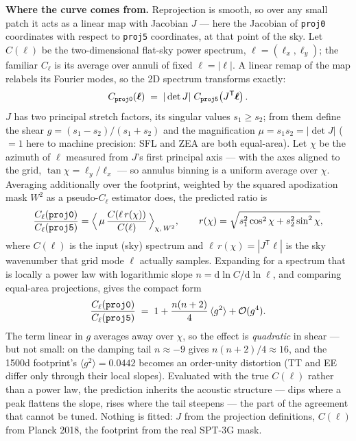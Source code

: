 \documentclass[10pt]{article}
\newcommand{\proj}[1]{\texttt{#1}}
\begin{document}
\textbf{Where the curve comes from.}
Reprojection is smooth, so over any small patch it acts as a linear map with Jacobian $J$ --- here the Jacobian of \proj{proj0} coordinates with respect to \proj{proj5} coordinates, at that point of the sky.
Let $C(\boldsymbol\ell)$ be the two-dimensional flat-sky power spectrum, $\boldsymbol\ell=(\ell_x,\ell_y)$; the familiar $C_\ell$ is its average over annuli of fixed $\ell=|\boldsymbol\ell|$.
A linear remap of the map relabels its Fourier modes, so the 2D spectrum transforms exactly:
\[
C_{\text{\proj{proj0}}}(\boldsymbol\ell) \;=\; |\det J|\; C_{\text{\proj{proj5}}}\!\left(J^{\mathsf T}\boldsymbol\ell\right).
\]
$J$ has two principal stretch factors, its singular values $s_1\ge s_2$; from them define the shear $g=(s_1-s_2)/(s_1+s_2)$ and the magnification $\mu=s_1 s_2=|\det J|$ ($=1$ here to machine precision: SFL and ZEA are both equal-area).
Let $\chi$ be the azimuth of $\boldsymbol\ell$ measured from $J$'s first principal axis --- with the axes aligned to the grid, $\tan\chi=\ell_y/\ell_x$ --- so annulus binning is a uniform average over $\chi$.
Averaging additionally over the footprint, weighted by the squared apodization mask $W^2$ as a pseudo-$C_\ell$ estimator does, the predicted ratio is
\[
\frac{C_\ell(\text{\proj{proj0}})}{C_\ell(\text{\proj{proj5}})}
=\Big\langle\, \mu\,\frac{C\!\left(\ell\, r(\chi)\right)}{C(\ell)} \,\Big\rangle_{\chi,\,W^2},
\qquad
r(\chi)=\sqrt{s_1^2\cos^2\chi + s_2^2\sin^2\chi},
\]
where $C(\ell)$ is the input (sky) spectrum and $\ell\,r(\chi)=|J^{\mathsf T}\boldsymbol\ell|$ is the sky wavenumber that grid mode $\boldsymbol\ell$ actually samples.
Expanding for a spectrum that is locally a power law with logarithmic slope $n = \mathrm{d}\ln C/\mathrm{d}\ln\ell$, and comparing equal-area projections, gives the compact form
\[
\frac{C_\ell(\text{\proj{proj0}})}{C_\ell(\text{\proj{proj5}})}
\;=\;1+\frac{n(n+2)}{4}\,\langle g^2\rangle + \mathcal{O}(g^4).
\]
The term linear in $g$ averages away over $\chi$, so the effect is \emph{quadratic} in shear --- but not small: on the damping tail $n\approx-9$ gives $n(n+2)/4\approx16$, and the 1500d footprint's $\langle g^2\rangle=0.0442$ becomes an order-unity distortion (TT and EE differ only through their local slopes).
Evaluated with the true $C(\ell)$ rather than a power law, the prediction inherits the acoustic structure --- dips where a peak flattens the slope, rises where the tail steepens --- the part of the agreement that cannot be tuned.
Nothing is fitted: $J$ from the projection definitions, $C(\ell)$ from Planck 2018, the footprint from the real SPT-3G mask.
\end{document}
